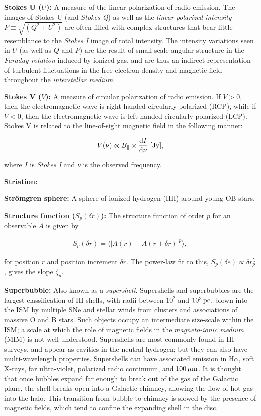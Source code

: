 \documentclass[a4paper,10pt]{article}
\begin{document}
{\noindent}\textbf{Stokes U ($U$):} A measure of the linear polarization of radio emission. The images of Stokes U (and \textit{Stokes Q}) as well as the \textit{linear polarized intensity} $P\equiv\sqrt{(Q^2+U^2)}$ are often filled with complex structures that bear little resemblance to the \textit{Stokes I} image of total intensity. The intensity variations seen in $U$ (as well as $Q$ and $P$) are the result of small-scale angular structure in the \textit{Faraday rotation} induced by ionized gas, and are thus an indirect representation of turbulent fluctuations in the free-electron density and magnetic field throughout the \textit{interstellar medium}.

{\noindent}\textbf{Stokes V ($V$):} A measure of circular polarization of radio emission. If $V>0$, then the electromagnetic wave is right-handed circularly polarized (RCP), while if $V<0$, then the electromagnetic wave is left-handed circularly polarized (LCP). Stokes V is related to the line-of-sight magnetic field in the following manner:

\begin{align*}
    V(\nu) \propto B_\parallel \times \frac{\mathrm{d}I}{\mathrm{d}\nu} ~ [{\rm Jy}],
\end{align*}

{\noindent}where $I$ is \textit{Stokes I} and $\nu$ is the observed frequency.

{\noindent}\textbf{Striation:} 

{\noindent}\textbf{Str\"{o}mgren sphere:} A sphere of ionized hydrogen (HII) around young OB stars.

{\noindent}\textbf{Structure function ($S_p(\delta r)$):} The structure function of order $p$ for an observable $A$ is given by

\begin{align*}
    S_p(\delta r) = \langle\lvert A(r)-A(r+\delta r)\rvert^p\rangle,
\end{align*}

{\noindent}for position $r$ and position increment $\delta r$. The power-law fit to this, $S_p(\delta e)\propto\delta r^{\upzeta}_p$, gives the slope $\zeta_p$.

{\noindent}\textbf{Superbubble:} Also known as a \textit{supershell}. Supershells and superbubbles are the largest classification of HI shells, with radii between $10^2$ and $10^3\,{\rm pc}$, blown into the ISM by multiple SNe and stellar winds from clusters and associations of massive O and B stars. Such objects occupy an intermediate size-scale within the ISM; a scale at which the role of magnetic fields in the \textit{magneto-ionic medium} (MIM) is not well understood. Supershells are most commonly found in HI surveys, and appear as cavities in the neutral hydrogen; but they can also have multi-wavelength properties. Supershells can have associated emission in H$\alpha$, soft X-rays, far ultra-violet, polarized radio continuum, and $100\,\mu{\rm m}$. It is thought that once bubbles expand far enough to break out of the gas of the Galactic plane, the shell breaks open into a Galactic chimney, allowing the flow of hot gas into the halo. This transition from bubble to chimney is slowed by the presence of magnetic fields, which tend to confine the expanding shell in the disc.
\end{document}
